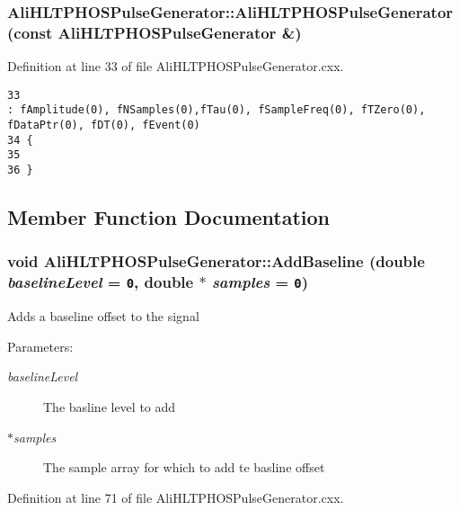\subsubsection{\setlength{\rightskip}{0pt plus 5cm}Ali\-HLTPHOSPulse\-Generator::Ali\-HLTPHOSPulse\-Generator (const {\bf Ali\-HLTPHOSPulse\-Generator} \&)}\label{classAliHLTPHOSPulseGenerator_a3}




Definition at line 33 of file Ali\-HLTPHOSPulse\-Generator.cxx.

\footnotesize\begin{verbatim}33                                                                                   : fAmplitude(0), fNSamples(0),fTau(0), fSampleFreq(0), fTZero(0), fDataPtr(0), fDT(0), fEvent(0)
34 {
35   
36 }
\end{verbatim}\normalsize 




\subsection{Member Function Documentation}
\subsubsection{\setlength{\rightskip}{0pt plus 5cm}void Ali\-HLTPHOSPulse\-Generator::Add\-Baseline (double {\em baseline\-Level} = {\tt 0}, double $\ast$ {\em samples} = {\tt 0})}\label{classAliHLTPHOSPulseGenerator_a5}


Adds a baseline offset to the signal \begin{Desc}
\item[Parameters:]
\begin{description}
\item[{\em baseline\-Level}]The basline level to add \item[{\em $\ast$samples}]The sample array for which to add te basline offset \end{description}
\end{Desc}


Definition at line 71 of file Ali\-HLTPHOSPulse\-Generator.cxx.

